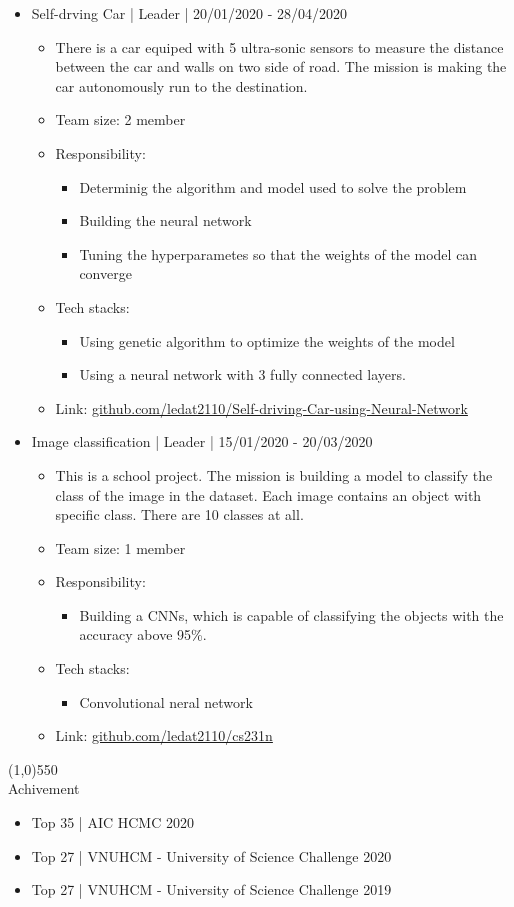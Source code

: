 \documentclass[a4paper, 12pt]{article}
\begin{document}
\begin{itemize}
    \item Self-drving Car | Leader | 20/01/2020 - 28/04/2020
      \begin {itemize}
        \item There is a car equiped with 5 ultra-sonic sensors to measure the distance between the car and walls on two side of road. The mission is making the car autonomously run to the destination.
        \item Team size: 2 member
        \item Responsibility:
        \begin{itemize}
          \item Determinig the algorithm and model used to solve the problem
          \item Building the neural network
          \item Tuning the hyperparametes so that the weights of the model can converge
        \end{itemize}
        \item Tech stacks: 
        \begin{itemize}
          \item Using genetic algorithm to optimize the weights of the model
          \item Using a neural network with 3 fully connected layers.
        \end{itemize}
        \item Link: \url{github.com/ledat2110/Self-driving-Car-using-Neural-Network}
      \end{itemize}

    \item Image classification | Leader | 15/01/2020 - 20/03/2020
      \begin{itemize}
        \item This is a school project. The mission is building a model to classify the class of the image in the dataset. Each image contains an object with specific class. There are 10 classes at all.
        \item Team size: 1 member
        \item Responsibility:
          \begin{itemize}
              \item Building a CNNs, which is capable of classifying the objects with the accuracy above 95\%.
          \end{itemize}
        \item Tech stacks:
          \begin{itemize}
              \item Convolutional neral network
          \end{itemize}
        \item Link: \url{github.com/ledat2110/cs231n}
      \end{itemize}

      
\end{itemize}

\line(1,0){550}\\
\vspace{5mm}
{\huge Achivement}
\begin{itemize}
    \item Top 35 | AIC HCMC 2020
    \item Top 27 | VNUHCM - University of Science Challenge 2020
    \item Top 27 | VNUHCM - University of Science Challenge 2019
\end{itemize}
\end{document}
